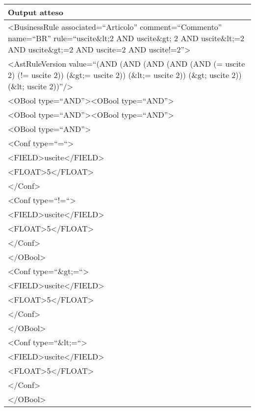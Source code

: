 \begin{center}
\begin{tabular}{|p{11cm}|} \hline
\textbf{Output atteso}\\ \hline
\textless BusinessRule associated=``Articolo'' comment=``Commento'' name=``BR'' rule=``uscite\&lt;2 AND uscite\&gt; 2 AND uscite\&lt;=2 AND uscite\&gt;=2 AND uscite=2 AND uscite!=2''\textgreater\\
 \textless AstRuleVersion value=``(AND (AND (AND (AND (AND (= uscite 2) (!= uscite 2)) (\&gt;= uscite 2)) (\&lt;= uscite 2)) (\&gt; uscite 2)) (\&lt; uscite 2))''/\textgreater \\
\textless OBool type=``AND''\textgreater \textless OBool type=``AND''\textgreater\\
\textless OBool type=``AND''\textgreater \textless OBool type=``AND''\textgreater\\
\textless OBool type=``AND''\textgreater\\
\textless Conf type=``=``\textgreater \\
\textless FIELD\textgreater uscite\textless /FIELD\textgreater\\
 \textless FLOAT\textgreater 5\textless /FLOAT\textgreater\\
 \textless /Conf\textgreater\\
\textless Conf type=``!=``\textgreater \\
\textless FIELD\textgreater uscite\textless /FIELD\textgreater\\
 \textless FLOAT\textgreater 5\textless /FLOAT\textgreater\\
 \textless /Conf\textgreater\\
\textless /OBool\textgreater \\
\textless Conf type=``\&gt;=``\textgreater \\
\textless FIELD\textgreater uscite\textless /FIELD\textgreater\\
 \textless FLOAT\textgreater 5\textless /FLOAT\textgreater\\
 \textless /Conf\textgreater\\
\textless /OBool\textgreater \\
\textless Conf type=``\&lt;=``\textgreater \\
\textless FIELD\textgreater uscite\textless /FIELD\textgreater\\
 \textless FLOAT\textgreater 5\textless /FLOAT\textgreater\\
 \textless /Conf\textgreater\\
\textless /OBool\textgreater \\

\end{tabular}
\end{center}
